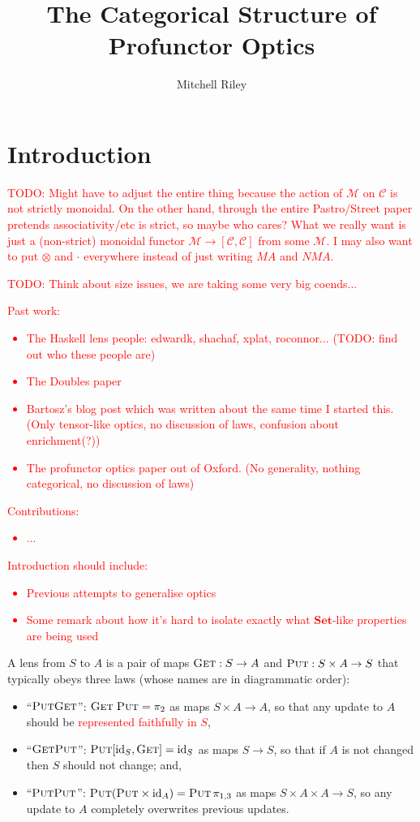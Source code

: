 \documentclass[11pt,a4paper]{article}
\title{The Categorical Structure of Profunctor Optics}
\author{Mitchell Riley}
\theoremstyle{plain}
\theoremstyle{definition}
\newcommand{\C}{\mathscr{C}}
\newcommand{\M}{\mathscr{M}}
\newcommand{\Set}{\mathbf{Set}}
\newcommand{\id}{\mathrm{id}}
\newcommand{\fget}{\textsc{Get}}
\newcommand{\fput}{\textsc{Put}}
\newcommand{\todo}[1]{\textcolor{red}{\small #1}}
\begin{document}
\maketitle

\section{Introduction}

\todo{TODO: Might have to adjust the entire thing because the action of $\M$ on $\C$ is not strictly monoidal. On the other hand, through the entire Pastro/Street paper pretends associativity/etc is strict, so maybe who cares? What we really want is just a (non-strict) monoidal functor $\M \to [\C, \C]$ from some $\M$. I may also want to put $\otimes$ and $\cdot$ everywhere instead of just writing $MA$ and $NMA$.}

\todo{TODO: Think about size issues, we are taking some very big coends...}

\todo{Past work:
\begin{itemize}
\item The Haskell lens people: edwardk, shachaf, xplat, roconnor... (TODO: find out who these people are)
\item The Doubles paper
\item Bartosz's blog post which was written about the same time I started this. (Only tensor-like optics, no discussion of laws, confusion about enrichment(?))
\item The profunctor optics paper out of Oxford. (No generality, nothing categorical, no discussion of laws)
\end{itemize}
}

\todo{Contributions:
\begin{itemize}
\item ...
\end{itemize}
}

\todo{Introduction should include:
\begin{itemize}
\item Previous attempts to generalise optics
\item Some remark about how it's hard to isolate exactly what $\Set$-like properties are being used
\end{itemize}
}
A lens from $S$ to $A$ is a pair of maps $\fget : S \to A$ and $\fput : S \times A \to S$ that typically obeys three laws (whose names are in diagrammatic order):
\begin{itemize}
\item ``$\fput\fget$'': $\fget \; \fput = \pi_2$ as maps $S \times A \to A$, so that any update to $A$ should be \todo{represented faithfully in $S$},
\item ``$\fget\fput$'': $\fput [\id_S, \fget] = \id_S$ as maps $S \to S$, so that if $A$ is not changed then $S$ should not change; and,
\item ``$\fput\fput$'': $\fput (\fput \times \id_A) = \fput \, \pi_{1, 3}$ as maps $S \times A \times A \to S$, so any update to $A$ completely overwrites previous updates.
\end{itemize}
\end{document}
